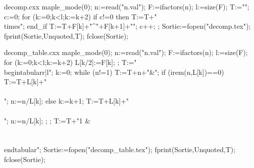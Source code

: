 
\begin{VerbatimOut}{decomp.cxx}
maple_mode(0);
n:=read("n.val");
F:=ifactors(n);
l:=size(F);
T:="";
c:=0;
for (k:=0;k<l;k:=k+2) { if c!=0 then T:=T+"\\times"; end_if T:=T+F[k]+"^{"+F[k+1]+"}"; c++; };
Sortie:=fopen("decomp.tex");
fprint(Sortie,Unquoted,T);
fclose(Sortie);
\end{VerbatimOut}
  
\newenvironment*{ifactors}
{\VerbatimEnvironment\begin{VerbatimOut}{n.val}}
{\end{VerbatimOut}
\immediate\write18{giac <decomp.cxx}
\ensuremath{}
}


\begin{VerbatimOut}{decomp_table.cxx}
maple_mode(0);
n:=read("n.val");
F:=ifactors(n);
l:=size(F);
for (k:=0;k<l;k:=k+2){ L[k/2]:=F[k]; }; 
T:="\\begin{tabular}{r|l}";
k:=0;
while (n!=1) { T:=T+n+"&"; if (irem(n,L[k])==0) { T:=T+L[k]+"\\\\"; n:=n/L[k]; } else { k:=k+1; T:=T+L[k]+"\\\\"; n:=n/L[k]; };  };
T:=T+"1 & \\\\\\end{tabular}";
Sortie:=fopen("decomp_table.tex");
fprint(Sortie,Unquoted,T);
fclose(Sortie);
\end{VerbatimOut}
  
\newenvironment*{ifactorstable}
{\VerbatimEnvironment\begin{VerbatimOut}{n.val}}
{\end{VerbatimOut}
\immediate\write18{giac <decomp_table.cxx}

}